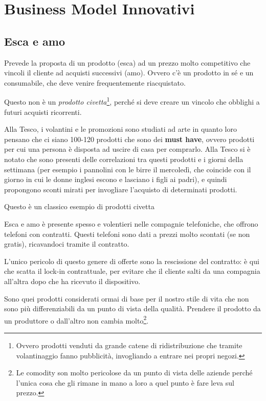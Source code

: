 \chapter{Business Model Innovativi}

\section{Esca e amo}

Prevede la proposta di un prodotto (esca) ad un prezzo molto competitivo che
vincoli il cliente ad acquisti successivi (amo). Ovvero c'è un prodotto in sé e
un consumabile, che deve venire frequentemente riacquistato.

Questo non è un \textit{prodotto civetta}\footnote{Ovvero prodotti venduti da
grande catene di ridistribuzione che tramite volantinaggio fanno pubblicità,
invogliando a entrare nei propri negozi.}, perché si deve creare un vincolo che
obblighi a futuri acquisti ricorrenti.

\begin{example}[Tesco]
Alla Tesco, i volantini e le promozioni sono studiati ad arte in quanto loro
pensano che ci siano 100-120 prodotti che sono dei \textbf{must have}, ovvero
prodotti per cui una persona è disposta ad uscire di casa per comprarlo. Alla
Tesco si è notato che sono presenti delle correlazioni tra questi prodotti e i
giorni della settimana (per esempio i pannolini con le birre il mercoledì, che
coincide con il giorno in cui le donne inglesi escono e lasciano i figli ai
padri), e quindi propongono sconti mirati per invogliare l'acquisto di
determinati prodotti.

Questo è un classico esempio di prodotti civetta
\end{example}

Esca e amo è presente spesso e volentieri nelle compagnie telefoniche, che
offrono telefoni con contratti. Questi telefoni sono dati a prezzi molto
scontati (se non gratis), ricavandoci tramite il contratto.


L'unico pericolo di questo genere di offerte sono la rescissione del contratto:
è qui che scatta il lock-in contrattuale, per evitare che il cliente salti da
una compagnia all'altra dopo che ha ricevuto il dispositivo.

\begin{definition}[Comodity]
Sono quei prodotti considerati ormai di base per il nostro stile di vita che
non sono più differenziabili da un punto di vista della qualità. Prendere il
prodotto da un produttore o dall'altro non cambia molto\footnote{Le comodity
son molto pericolose da un punto di vista delle aziende perché l'unica cosa che
gli rimane in mano a loro a quel punto è fare leva sul prezzo.}.
\end{definition}

